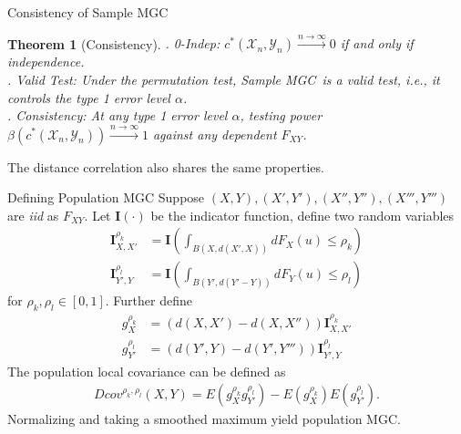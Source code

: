 \documentclass[mathserif,t]{beamer}
\newtheorem{thm}{Theorem}
\newtheorem*{defi*}{Definition}
\providecommand{\mb}[1]{\boldsymbol{#1}}
\newcommand{\Mgc}{MGC}
\newcommand{\mbx}{X}
\newcommand{\mby}{Y}
\begin{document}
\begin{frame}{Consistency of Sample \Mgc}
\begin{thm}[Consistency]
. 0-Indep: $c^{*}(\mathcal{X}_{n},\mathcal{Y}_{n}) \stackrel{n \rightarrow \infty}{\rightarrow}0$ if and only if independence.\\
\pause
{}. Valid Test: Under the permutation test, Sample \Mgc~is a valid test, i.e., it controls the type 1 error level $\alpha$.\\
\pause
{}. Consistency: At any type 1 error level $\alpha$, testing power $\beta(c^{*}(\mathcal{X}_{n},\mathcal{Y}_{n})) \stackrel{n \rightarrow \infty}{\rightarrow} 1$ against any dependent $F_{\mbx \mby}$.\\
\end{thm}
\pause
\medskip
The distance correlation also shares the same properties.
\end{frame}

\begin{frame}{Defining Population \Mgc}
Suppose $(\mbx,\mby), (\mbx',\mby'), (\mbx'',\mby''), (\mbx''',\mby''')$ are \emph{iid} as $F_{XY}$. 
\pause
Let $\mb{I}(\cdot)$ be the indicator function, define two random variables
\begin{align*}
\mb{I}_{\mbx,\mbx'}^{\rho_{k}} &=\mb{I}(\int_{B(\mbx,d(\mbx',\mbx))} dF_\mbx(u) \leq \rho_k)  \\
\mb{I}_{\mby',\mby}^{\rho_{l}} &=\mb{I}(\int_{B(\mby',d(\mby'-\mby))} dF_\mby(u) \leq \rho_l)
\end{align*}
for $\rho_{k},\rho_{l} \in [0,1]$.
\pause
Further define
\begin{align*}
g^{\rho_{k}}_{\mbx} &=(d(\mbx,\mbx') - d(\mbx,\mbx'')) \mb{I}_{\mbx,\mbx'}^{\rho_{k}} \\
g^{\rho_{l}}_{\mby'} &=(d(\mby',\mby) - d(\mby',\mby''')) \mb{I}_{\mby',\mby}^{\rho_{l}}
\end{align*}
\pause
The population local covariance can be defined as
\begin{align*}
Dcov^{\rho_{k}, \rho_{l}}(\mbx,\mby) = E(g^{\rho_{k}}_{\mbx} g^{\rho_{l}}_{\mby'}) - E(g^{\rho_{k}}_{\mbx}) E(g^{\rho_{l}}_{\mby'}).
\end{align*}
\pause
Normalizing and taking a smoothed maximum yield population \Mgc.
\end{frame}
\end{document}
